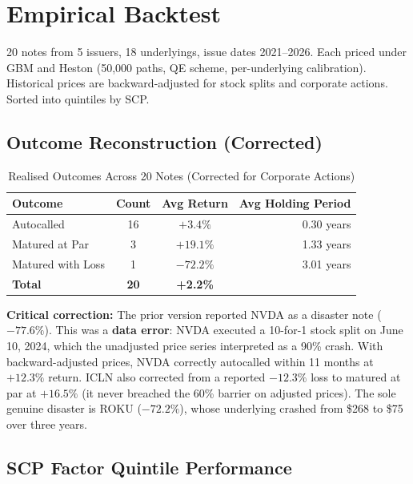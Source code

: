 \documentclass[10pt,a4paper]{article}
\begin{document}
\newpage\section{Empirical Backtest}\label{sec:backtest}
20 notes from 5 issuers, 18 underlyings, issue dates 2021--2026. Each priced under GBM and Heston (50,000 paths, QE scheme, per-underlying calibration). Historical prices are backward-adjusted for stock splits and corporate actions. Sorted into quintiles by SCP.

\subsection{Outcome Reconstruction (Corrected)}

\begin{table}[H]\centering\small
\caption{Realised Outcomes Across 20 Notes (Corrected for Corporate Actions)}
\begin{tabular}{@{}lccr@{}}\toprule
\textbf{Outcome}&\textbf{Count}&\textbf{Avg Return}&\textbf{Avg Holding Period}\\\midrule
Autocalled&16&$+3.4\%$&0.30 years\\
Matured at Par&3&$+19.1\%$&1.33 years\\
Matured with Loss&1&$-72.2\%$&3.01 years\\
\midrule
\textbf{Total}&\textbf{20}&\textbf{+2.2\%}&\\\bottomrule
\end{tabular}\end{table}

\textbf{Critical correction:} The prior version reported NVDA as a disaster note ($-77.6\%$). This was a \textbf{data error}: NVDA executed a 10-for-1 stock split on June 10, 2024, which the unadjusted price series interpreted as a 90\% crash. With backward-adjusted prices, NVDA correctly autocalled within 11 months at $+12.3\%$ return. ICLN also corrected from a reported $-12.3\%$ loss to matured at par at $+16.5\%$ (it never breached the 60\% barrier on adjusted prices). The sole genuine disaster is ROKU ($-72.2\%$), whose underlying crashed from \$268 to \$75 over three years.

\subsection{SCP Factor Quintile Performance}
\end{document}
